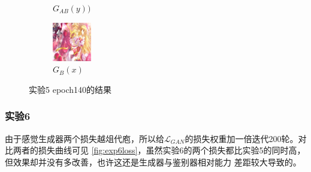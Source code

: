 \documentclass[twocolumn,11pt]{ctexart}
\begin{document}
\begin{figure}[htb]
\begin{subfigure}[b]{0.23\linewidth}
        \caption{$G_{AB}(y))$}
      \end{subfigure}
      \begin{subfigure}[b]{0.23\linewidth}
        \includegraphics[width=\linewidth]{exp5_epoch140_idt_B.png}
        \caption{$G_B(x)$}
      \end{subfigure}
      \caption{实验5 epoch140的结果}
      \label{fig:exp5epoch140}
\end{figure}

\subsubsection{实验6}

由于感觉生成器两个损失越俎代庖，所以给$\mathcal{L}_{GAN}$的损失权重加一倍迭代200轮。对比两者的损失曲线可见 
\ref{fig:exp6loss}，虽然实验6的两个损失都比实验5的同时高，但效果却并没有多改善，也许这还是生成器与鉴别器相对能力
差距较大导致的。
\end{document}
